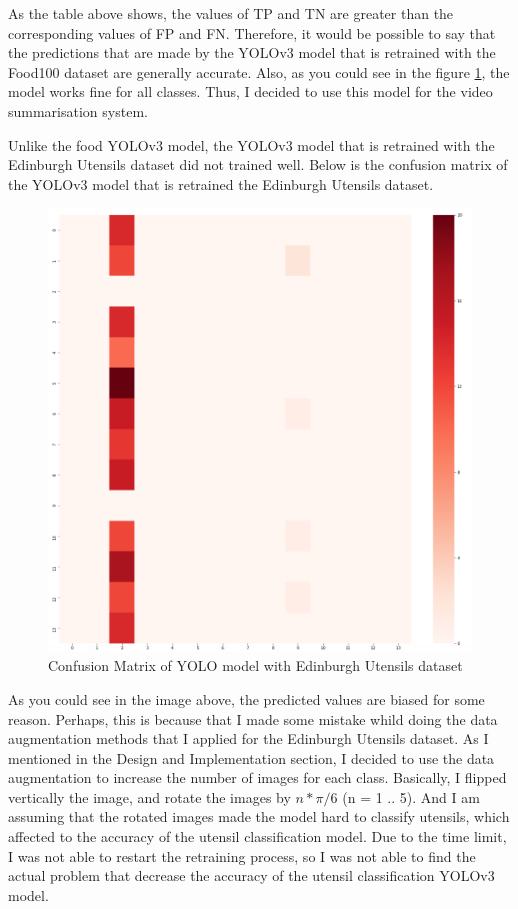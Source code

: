 \documentclass{article}
\begin{document}
As the table above shows, the values of TP and TN are greater than the corresponding values of FP and FN. Therefore, it would be possible to say that the predictions that are made by the YOLOv3 model that is retrained with the Food100 dataset are generally accurate. Also, as you could see in the figure \ref{fig:cm_food100}, the model works fine for all classes. Thus, I decided to use this model for the video summarisation system.

Unlike the food YOLOv3 model, the YOLOv3 model that is retrained with the Edinburgh Utensils dataset did not trained well. Below is the confusion matrix of the YOLOv3 model that is retrained the Edinburgh Utensils dataset.

\begin{figure}[H]
    \centering
    \includegraphics[scale=0.4]{imgs/cm_utensils.png}
    \caption{Confusion Matrix of YOLO model with Edinburgh Utensils dataset}
    \label{fig:cm_food100}
\end{figure}

As you could see in the image above, the predicted values are biased for some reason. Perhaps, this is because that I made some mistake whild doing the data augmentation methods that I applied for the Edinburgh Utensils dataset. As I mentioned in the Design and Implementation section, I decided to use the data augmentation to increase the number of images for each class. Basically, I flipped vertically the image, and rotate the images by $n * \pi / 6$ (n = 1 .. 5). And I am assuming that the rotated images made the model hard to classify utensils, which affected to the accuracy of the utensil classification model. Due to the time limit, I was not able to restart the retraining process, so I was not able to find the actual problem that decrease the accuracy of the utensil classification YOLOv3 model.
\end{document}
